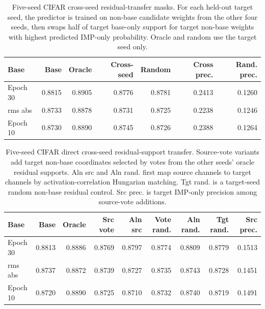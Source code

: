 \begin{table}[t]
\centering
\small
\setlength{\tabcolsep}{3pt}
\begin{tabular}{lrrrrrr}
\toprule
Base & Base & Oracle & Cross-seed & Random & Cross prec. & Rand. prec. \\
\midrule
Epoch 30 & 0.8815 & 0.8905 & 0.8776 & 0.8781 & 0.2413 & 0.1260 \\
rms abs & 0.8733 & 0.8878 & 0.8731 & 0.8725 & 0.2238 & 0.1246 \\
Epoch 10 & 0.8730 & 0.8890 & 0.8745 & 0.8726 & 0.2388 & 0.1264 \\
\bottomrule
\end{tabular}
\caption{Five-seed CIFAR cross-seed residual-transfer masks. For each held-out target seed, the predictor is trained on non-base candidate weights from the other four seeds, then swaps half of target base-only support for target non-base weights with highest predicted IMP-only probability. Oracle and random use the target seed only.}
\label{tab:cifar-residual-cross-seed-transfer}
\end{table}

\begin{table}[t]
\centering
\scriptsize
\setlength{\tabcolsep}{2pt}
\begin{tabular}{lrrrrrrrr}
\toprule
Base & Base & Oracle & Src vote & Aln src & Vote rand. & Aln rand. & Tgt rand. & Src prec. \\
\midrule
Epoch 30 & 0.8813 & 0.8886 & 0.8769 & 0.8797 & 0.8774 & 0.8809 & 0.8779 & 0.1513 \\
rms abs & 0.8737 & 0.8872 & 0.8739 & 0.8727 & 0.8735 & 0.8743 & 0.8728 & 0.1451 \\
Epoch 10 & 0.8720 & 0.8890 & 0.8725 & 0.8710 & 0.8732 & 0.8740 & 0.8719 & 0.1491 \\
\bottomrule
\end{tabular}
\caption{Five-seed CIFAR direct cross-seed residual-support transfer. Source-vote variants add target non-base coordinates selected by votes from the other seeds' oracle residual supports. Aln src and Aln rand. first map source channels to target channels by activation-correlation Hungarian matching. Tgt rand. is a target-seed random non-base residual control. Src prec. is target IMP-only precision among source-vote additions.}
\label{tab:cifar-residual-direct-transfer}
\end{table}

